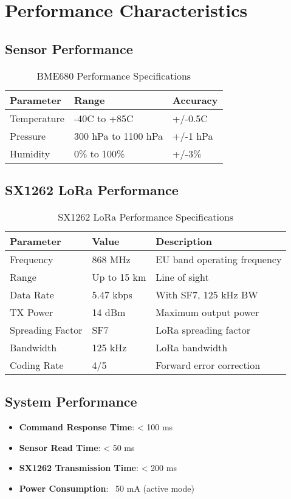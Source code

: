 \documentclass[11pt,a4paper]{article}
\begin{document}
\section{Performance Characteristics}

\subsection{Sensor Performance}
\begin{table}[h]
\centering
\begin{tabular}{|l|l|l|}
\hline
\textbf{Parameter} & \textbf{Range} & \textbf{Accuracy} \\
\hline
Temperature & -40C to +85C & +/-0.5C \\
\hline
Pressure & 300 hPa to 1100 hPa & +/-1 hPa \\
\hline
Humidity & 0\% to 100\% & +/-3\% \\
\hline
\end{tabular}
\caption{BME680 Performance Specifications}
\end{table}

\subsection{SX1262 LoRa Performance}
\begin{table}[h]
\centering
\begin{tabular}{|l|l|l|}
\hline
\textbf{Parameter} & \textbf{Value} & \textbf{Description} \\
\hline
Frequency & 868 MHz & EU band operating frequency \\
\hline
Range & Up to 15 km & Line of sight \\
\hline
Data Rate & 5.47 kbps & With SF7, 125 kHz BW \\
\hline
TX Power & 14 dBm & Maximum output power \\
\hline
Spreading Factor & SF7 & LoRa spreading factor \\
\hline
Bandwidth & 125 kHz & LoRa bandwidth \\
\hline
Coding Rate & 4/5 & Forward error correction \\
\hline
\end{tabular}
\caption{SX1262 LoRa Performance Specifications}
\end{table}

\subsection{System Performance}
\begin{itemize}
    \item \textbf{Command Response Time}: < 100 ms
    \item \textbf{Sensor Read Time}: < 50 ms
    \item \textbf{SX1262 Transmission Time}: < 200 ms
    \item \textbf{Power Consumption}: ~50 mA (active mode)
\end{itemize}
\end{document}
